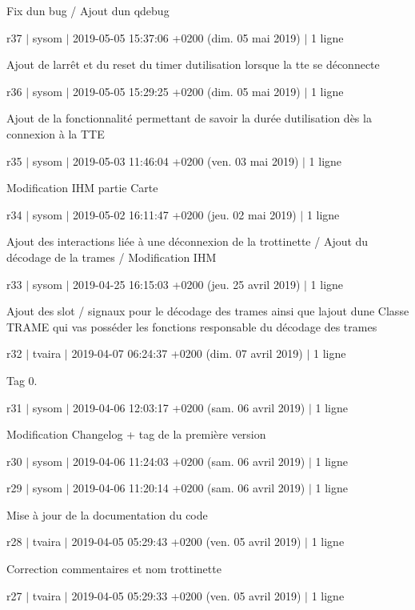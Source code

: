Fix d\textquotesingle{}un bug / Ajout d\textquotesingle{}un qdebug

r37 $\vert$ sysom $\vert$ 2019-\/05-\/05 15\+:37\+:06 +0200 (dim. 05 mai 2019) $\vert$ 1 ligne

Ajout de l\textquotesingle{}arrêt et du reset du timer d\textquotesingle{}utilisation lorsque la tte se déconnecte

r36 $\vert$ sysom $\vert$ 2019-\/05-\/05 15\+:29\+:25 +0200 (dim. 05 mai 2019) $\vert$ 1 ligne

Ajout de la fonctionnalité permettant de savoir la durée d\textquotesingle{}utilisation dès la connexion à la T\+TE

r35 $\vert$ sysom $\vert$ 2019-\/05-\/03 11\+:46\+:04 +0200 (ven. 03 mai 2019) $\vert$ 1 ligne

Modification I\+HM partie Carte

r34 $\vert$ sysom $\vert$ 2019-\/05-\/02 16\+:11\+:47 +0200 (jeu. 02 mai 2019) $\vert$ 1 ligne

Ajout des interactions liée à une déconnexion de la trottinette / Ajout du décodage de la trames / Modification I\+HM

r33 $\vert$ sysom $\vert$ 2019-\/04-\/25 16\+:15\+:03 +0200 (jeu. 25 avril 2019) $\vert$ 1 ligne

Ajout des slot / signaux pour le décodage des trames ainsi que l\textquotesingle{}ajout d\textquotesingle{}une Classe T\+R\+A\+ME qui vas posséder les fonctions responsable du décodage des trames

r32 $\vert$ tvaira $\vert$ 2019-\/04-\/07 06\+:24\+:37 +0200 (dim. 07 avril 2019) $\vert$ 1 ligne

Tag 0.

r31 $\vert$ sysom $\vert$ 2019-\/04-\/06 12\+:03\+:17 +0200 (sam. 06 avril 2019) $\vert$ 1 ligne

Modification Changelog + tag de la première version

r30 $\vert$ sysom $\vert$ 2019-\/04-\/06 11\+:24\+:03 +0200 (sam. 06 avril 2019) $\vert$ 1 ligne

r29 $\vert$ sysom $\vert$ 2019-\/04-\/06 11\+:20\+:14 +0200 (sam. 06 avril 2019) $\vert$ 1 ligne

Mise à jour de la documentation du code

r28 $\vert$ tvaira $\vert$ 2019-\/04-\/05 05\+:29\+:43 +0200 (ven. 05 avril 2019) $\vert$ 1 ligne

Correction commentaires et nom trottinette

r27 $\vert$ tvaira $\vert$ 2019-\/04-\/05 05\+:29\+:33 +0200 (ven. 05 avril 2019) $\vert$ 1 ligne

